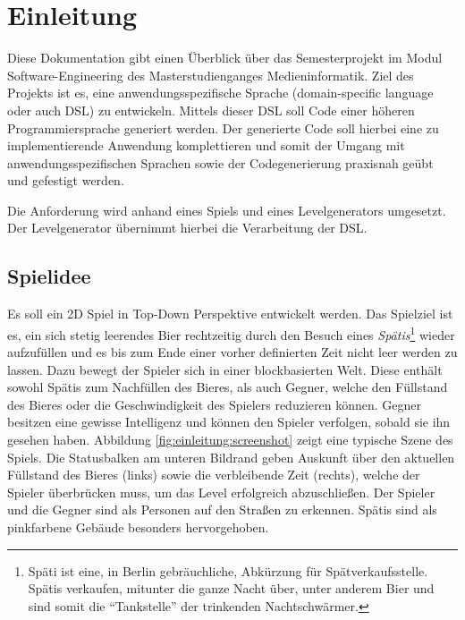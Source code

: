 \section{Einleitung}

Diese Dokumentation gibt einen Überblick über das Semesterprojekt im Modul Software-Engineering des Masterstudienganges Medieninformatik.
Ziel des Projekts ist es, eine anwendungsspezifische Sprache (domain-specific language oder auch DSL) zu entwickeln.
Mittels dieser DSL soll Code einer höheren Programmiersprache generiert werden.
Der generierte Code soll hierbei eine zu implementierende Anwendung komplettieren und somit der Umgang mit anwendungsspezifischen Sprachen sowie der Codegenerierung praxisnah geübt und gefestigt werden.

Die Anforderung wird anhand eines Spiels und eines Levelgenerators umgesetzt.
Der Levelgenerator übernimmt hierbei die Verarbeitung der DSL.

\subsection{Spielidee}

Es soll ein 2D Spiel in Top-Down Perspektive entwickelt werden.
Das Spielziel ist es, ein sich stetig leerendes Bier rechtzeitig durch den Besuch eines \textit{Spätis}\footnote{Späti ist eine, in Berlin gebräuchliche, Abkürzung für Spätverkaufsstelle. Spätis verkaufen, mitunter die ganze Nacht über, unter anderem Bier und sind somit die ``Tankstelle'' der trinkenden Nachtschwärmer.}
wieder aufzufüllen und es bis zum Ende einer vorher definierten Zeit nicht leer werden zu lassen.
Dazu bewegt der Spieler sich in einer blockbasierten Welt.
Diese enthält sowohl Spätis zum Nachfüllen des Bieres, als auch Gegner, welche den Füllstand des Bieres oder die Geschwindigkeit des Spielers reduzieren können.
Gegner besitzen eine gewisse Intelligenz und können den Spieler verfolgen, sobald sie ihn gesehen haben.
Abbildung \ref{fig:einleitung:screenshot} zeigt eine typische Szene des Spiels.
Die Statusbalken am unteren Bildrand geben Auskunft über den aktuellen Füllstand des Bieres (links) sowie die verbleibende Zeit (rechts), welche der Spieler überbrücken muss, um das Level erfolgreich abzuschließen.
Der Spieler und die Gegner sind als Personen auf den Straßen zu erkennen.
Spätis sind als pinkfarbene Gebäude besonders hervorgehoben.

